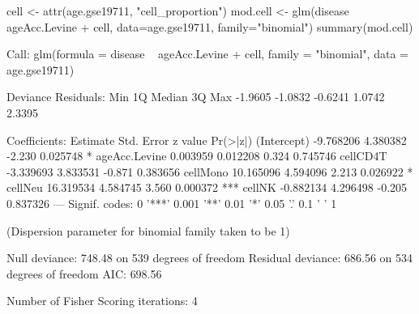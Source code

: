 \documentclass[]{article}
\newcommand{\hlnum}[1]{\textcolor[rgb]{0.816,0.125,0.439}{#1}}%
\newcommand{\hlstr}[1]{\textcolor[rgb]{0.251,0.627,0.251}{#1}}%
\newcommand{\hlopt}[1]{\textcolor[rgb]{0,0,0}{#1}}%
\newcommand{\hlstd}[1]{\textcolor[rgb]{0.251,0.251,0.251}{#1}}%
\newcommand{\hlkwc}[1]{\textcolor[rgb]{0.251,0.251,0.251}{#1}}%
\newcommand{\hlkwd}[1]{\textcolor[rgb]{0.878,0.439,0.125}{#1}}%
\newenvironment{Shaded}{\begin{myshaded}}{\end{myshaded}}
\newcommand{\KeywordTok}[1]{\hlkwd{#1}}
\newcommand{\DataTypeTok}[1]{\hlkwc{#1}}
\newcommand{\DecValTok}[1]{\hlnum{#1}}
\newcommand{\FloatTok}[1]{\hlnum{#1}}
\newcommand{\StringTok}[1]{\hlstr{#1}}
\newcommand{\ControlFlowTok}[1]{\hlkwd{#1}}
\newcommand{\OperatorTok}[1]{\hlopt{#1}}
\newcommand{\ErrorTok}[1]{\textcolor{errorcolor}{#1}}
\newcommand{\NormalTok}[1]{\hlstd{#1}}
\begin{document}
\begin{Shaded}
\begin{Highlighting}[]
\NormalTok{cell <-}\StringTok{ }\KeywordTok{attr}\NormalTok{(age.gse19711, }\StringTok{"cell_proportion"}\NormalTok{)}
\NormalTok{mod.cell <-}\StringTok{ }\KeywordTok{glm}\NormalTok{(disease }\OperatorTok{~}\StringTok{ }\NormalTok{ageAcc.Levine }\OperatorTok{+}\StringTok{ }\NormalTok{cell, }\DataTypeTok{data=}\NormalTok{age.gse19711,}
           \DataTypeTok{family=}\StringTok{"binomial"}\NormalTok{)}
\KeywordTok{summary}\NormalTok{(mod.cell)}
  
\NormalTok{  Call}\OperatorTok{:}
\StringTok{  }\KeywordTok{glm}\NormalTok{(}\DataTypeTok{formula =}\NormalTok{ disease }\OperatorTok{~}\StringTok{ }\NormalTok{ageAcc.Levine }\OperatorTok{+}\StringTok{ }\NormalTok{cell, }\DataTypeTok{family =} \StringTok{"binomial"}\NormalTok{, }
      \DataTypeTok{data =}\NormalTok{ age.gse19711)}
  
\NormalTok{  Deviance Residuals}\OperatorTok{:}\StringTok{ }
\StringTok{      }\NormalTok{Min       1Q   Median       3Q      Max  }
  \FloatTok{-1.9605}  \FloatTok{-1.0832}  \FloatTok{-0.6241}   \FloatTok{1.0742}   \FloatTok{2.3395}  
  
\NormalTok{  Coefficients}\OperatorTok{:}
\StringTok{                 }\NormalTok{Estimate Std. Error z value }\KeywordTok{Pr}\NormalTok{(}\OperatorTok{>}\ErrorTok{|}\NormalTok{z}\OperatorTok{|}\NormalTok{)    }
\NormalTok{  (Intercept)   }\FloatTok{-9.768206}   \FloatTok{4.380382}  \FloatTok{-2.230} \FloatTok{0.025748} \OperatorTok{*}\StringTok{  }
\StringTok{  }\NormalTok{ageAcc.Levine  }\FloatTok{0.003959}   \FloatTok{0.012208}   \FloatTok{0.324} \FloatTok{0.745746}    
\NormalTok{  cellCD4T      }\FloatTok{-3.339693}   \FloatTok{3.833531}  \FloatTok{-0.871} \FloatTok{0.383656}    
\NormalTok{  cellMono      }\FloatTok{10.165096}   \FloatTok{4.594096}   \FloatTok{2.213} \FloatTok{0.026922} \OperatorTok{*}\StringTok{  }
\StringTok{  }\NormalTok{cellNeu       }\FloatTok{16.319534}   \FloatTok{4.584745}   \FloatTok{3.560} \FloatTok{0.000372} \OperatorTok{**}\ErrorTok{*}
\StringTok{  }\NormalTok{cellNK        }\FloatTok{-0.882134}   \FloatTok{4.296498}  \FloatTok{-0.205} \FloatTok{0.837326}    
  \OperatorTok{---}
\StringTok{  }\NormalTok{Signif. codes}\OperatorTok{:}\StringTok{  }\DecValTok{0} \StringTok{'***'} \FloatTok{0.001} \StringTok{'**'} \FloatTok{0.01} \StringTok{'*'} \FloatTok{0.05} \StringTok{'.'} \FloatTok{0.1} \StringTok{' '} \DecValTok{1}
  
\NormalTok{  (Dispersion parameter }\ControlFlowTok{for}\NormalTok{ binomial family taken to be }\DecValTok{1}\NormalTok{)}
  
\NormalTok{      Null deviance}\OperatorTok{:}\StringTok{ }\FloatTok{748.48}\NormalTok{  on }\DecValTok{539}\NormalTok{  degrees of freedom}
\NormalTok{  Residual deviance}\OperatorTok{:}\StringTok{ }\FloatTok{686.56}\NormalTok{  on }\DecValTok{534}\NormalTok{  degrees of freedom}
\NormalTok{  AIC}\OperatorTok{:}\StringTok{ }\FloatTok{698.56}
  
\NormalTok{  Number of Fisher Scoring iterations}\OperatorTok{:}\StringTok{ }\DecValTok{4}
\end{Highlighting}
\end{Shaded}
\end{document}
